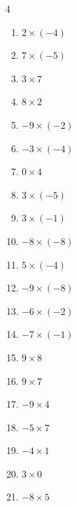 \begin{multicols}{4}
\begin{enumerate}
\resetques

  \item $2\times (-4)$
        \phantom{$=-8$}

  \item $7\times (-5)$
        \phantom{$=-35$}

  \item $3\times 7$
        \phantom{$=21$}

  \item $8\times 2$
        \phantom{$=16$}

  \item $-9\times (-2)$
        \phantom{$=18$}

  \item $-3\times (-4)$
        \phantom{$=12$}

  \item $0\times 4$
        \phantom{$=0$}

  \item $3\times (-5)$
        \phantom{$=-15$}

  \item $3\times (-1)$
        \phantom{$=-3$}

  \item $-8\times (-8)$
        \phantom{$=64$}

  \item $5\times (-4)$
        \phantom{$=-20$}

  \item $-9\times (-8)$
        \phantom{$=72$}

  \item $-6\times (-2)$
        \phantom{$=12$}

  \item $-7\times (-1)$
        \phantom{$=7$}

  \item $9\times 8$
        \phantom{$=72$}

  \item $9\times 7$
        \phantom{$=63$}

  \item $-9\times 4$
        \phantom{$=-36$}

  \item $-5\times 7$
        \phantom{$=-35$}

  \item $-4\times 1$
        \phantom{$=-4$}

  \item $3\times 0$
        \phantom{$=0$}

  \item $-8\times 5$
        \phantom{$=-40$}


\end{enumerate}
\end{multicols}
